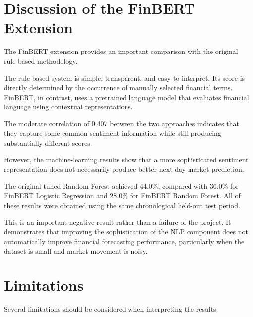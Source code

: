\documentclass[10pt,a4paper]{article}
\begin{document}
	\section{Discussion of the FinBERT Extension}
	
	The FinBERT extension provides an important comparison with the
	original rule-based methodology.
	
	The rule-based system is simple, transparent, and easy to interpret.
	Its score is directly determined by the occurrence of manually selected
	financial terms. FinBERT, in contrast, uses a pretrained language model
	that evaluates financial language using contextual representations.
	
	The moderate correlation of 0.407 between the two approaches indicates
	that they capture some common sentiment information while still
	producing substantially different scores.
	
	However, the machine-learning results show that a more sophisticated
	sentiment representation does not necessarily produce better
	next-day market prediction.
	
	The original tuned Random Forest achieved 44.0\%, compared with 36.0\%
	for FinBERT Logistic Regression and 28.0\% for FinBERT Random Forest.
	All of these results were obtained using the same chronological
	held-out test period.
	
	This is an important negative result rather than a failure of the
	project. It demonstrates that improving the sophistication of the NLP
	component does not automatically improve financial forecasting
	performance, particularly when the dataset is small and market
	movement is noisy.
	
	\section{Limitations}
	
	Several limitations should be considered when interpreting the results.
	
\end{document}
